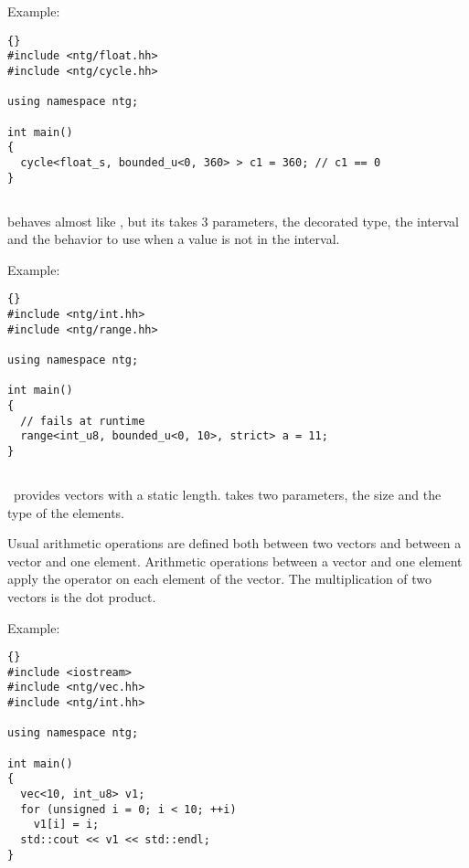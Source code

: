 Example:

\begin{lstlisting}{}
#include <ntg/float.hh>
#include <ntg/cycle.hh>

using namespace ntg;

int main()
{
  cycle<float_s, bounded_u<0, 360> > c1 = 360; // c1 == 0
}
\end{lstlisting}

\subsection{}

 behaves almost like , but its takes 3
parameters, the decorated type, the interval and the behavior to use
when a value is not in the interval.

Example:

\begin{lstlisting}{}
#include <ntg/int.hh>
#include <ntg/range.hh>

using namespace ntg;

int main()
{
  // fails at runtime
  range<int_u8, bounded_u<0, 10>, strict> a = 11;
}
\end{lstlisting}

\subsection{}

\integre\ provides vectors with a static length.   takes two
parameters, the size and the type of the elements.

Usual arithmetic operations are defined both between two vectors and
between a vector and one element.  Arithmetic operations between a
vector and one element apply the operator on each element of the
vector.  The multiplication of two vectors is the dot product.

Example:

\begin{lstlisting}{}
#include <iostream>
#include <ntg/vec.hh>
#include <ntg/int.hh>

using namespace ntg;

int main()
{
  vec<10, int_u8> v1;
  for (unsigned i = 0; i < 10; ++i)
    v1[i] = i;
  std::cout << v1 << std::endl;
}
\end{lstlisting}

\subsection{}

